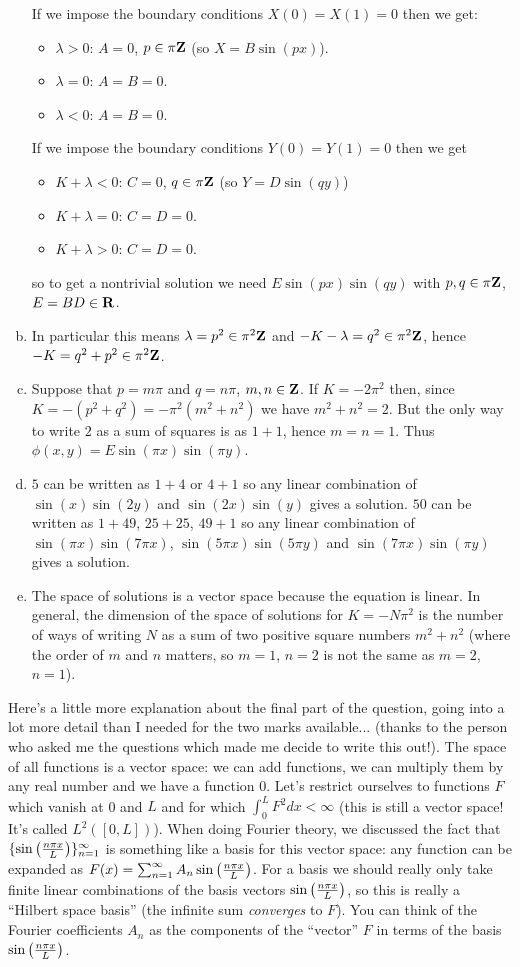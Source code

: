 \documentclass[12pt]{article}
\begin{document}
\begin{answer}
\begin{enumerate}[(a)]
If we impose the boundary conditions $X(0)=X(1)=0$ then we get:
\begin{itemize}
\item $\lambda>0$: $A=0$, $p\in\pi\mathbf{Z}$ (so $X=B\sin(px)$).
\item $\lambda=0$: $A=B=0$.
\item $\lambda<0$: $A=B=0$.
\end{itemize}
If we impose the boundary conditions $Y(0)=Y(1)=0$ then we get
\begin{itemize}
\item $K+\lambda<0$: $C=0$, $q\in\pi\mathbf{Z}$ (so $Y=D\sin(qy)$)
\item $K+\lambda=0$: $C=D=0$.
\item $K+\lambda>0$: $C=D=0$.
\end{itemize}
so to get a nontrivial solution we need $E\sin(px)\sin(qy)$ with $p,q\in\pi\mathbf{Z}$, $E=BD\in\mathbf{R}$.
\item In particular this means $\lambda=p^2\in\pi^2\mathbf{Z}$ and $-K-\lambda=q^2\in\pi^2\mathbf{Z}$, hence $-K=q^2+p^2\in\pi^2\mathbf{Z}$.
\item Suppose that $p=m\pi$ and $q=n\pi$, $m,n\in\mathbf{Z}$. If $K=-2\pi^2$ then, since $K=-(p^2+q^2)=-\pi^2(m^2+n^2)$ we have $m^2+n^2=2$. But the only way to write $2$ as a sum of squares is as $1+1$, hence $m=n=1$. Thus $\phi(x,y)=E\sin(\pi x)\sin(\pi y)$.
\item $5$ can be written as $1+4$ or $4+1$ so any linear combination of $\sin(x)\sin(2y)$ and $\sin(2x)\sin(y)$ gives a solution. $50$ can be written as $1+49$, $25+25$, $49+1$ so any linear combination of $\sin(\pi x)\sin(7\pi x)$, $\sin(5\pi x)\sin(5\pi y)$ and $\sin(7\pi x)\sin(\pi y)$ gives a solution.
\item The space of solutions is a vector space because the equation is linear. In general, the dimension of the space of solutions for $K=-N\pi^2$ is the number of ways of writing $N$ as a sum of two positive square numbers $m^2+n^2$ (where the order of $m$ and $n$ matters, so $m=1$, $n=2$ is not the same as $m=2$, $n=1$).
\end{enumerate}
{\small Here's a little more explanation about the final part of the question, going into a lot more detail than I needed for the two marks available... (thanks to the person who asked me the questions which made me decide to write this out!). The space of all functions is a vector space: we can add functions, we can multiply them by any real number and we have a function 0. Let's restrict ourselves to functions $F$ which vanish at 0 and $L$ and for which $\int_0^LF^2dx<\infty$ (this is still a vector space! It's called $L^2([0,L])$). When doing Fourier theory, we discussed the fact that $\{\sin\left(\frac{n \pi x}{L}\right)\}_{n=1}^{\infty}$ is something like a basis for this vector space: any function can be expanded as $F(x)=\sum_{n=1}^{\infty}A_n\sin\left(\frac{n \pi x}{L}\right)$. For a basis we should really only take finite linear combinations of the basis vectors $\sin\left(\frac{n \pi x}{L}\right)$, so this is really a ``Hilbert space basis'' (the infinite sum {\em converges} to $F$). You can think of the Fourier coefficients $A_n$ as the components of the ``vector'' $F$ in terms of the basis $\sin\left(\frac{n \pi x}{L}\right)$.

}
\end{answer}
\end{document}
